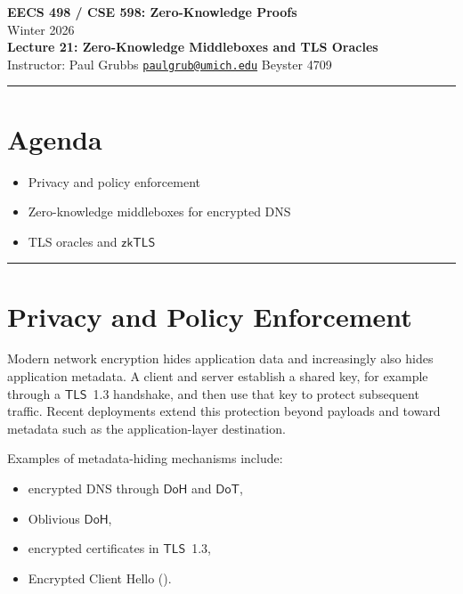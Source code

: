 \documentclass[11pt]{article}
\newcommand{\TLS}{\ensuremath{\mathsf{TLS}}}
\newcommand{\DoH}{\ensuremath{\mathsf{DoH}}}
\newcommand{\DoT}{\ensuremath{\mathsf{DoT}}}
\newcommand{\ZKTLS}{\ensuremath{\mathsf{zkTLS}}}
\begin{document}
\begin{center}
  {\LARGE \textbf{EECS 498 / CSE 598: Zero-Knowledge Proofs}}\\[6pt]
  {\large Winter 2026}\\[4pt]
  {\large \textbf{Lecture 21: Zero-Knowledge Middleboxes and TLS Oracles}}\\[4pt]
  {\large Instructor: Paul Grubbs \quad
    \href{mailto:paulgrub@umich.edu}{\texttt{paulgrub@umich.edu}} \quad
    Beyster 4709}
\end{center}

\vspace{0.5em}
\hrule
\vspace{1em}

\section*{Agenda}
\begin{itemize}
  \item Privacy and policy enforcement
  \item Zero-knowledge middleboxes for encrypted DNS
  \item TLS oracles and \ZKTLS
\end{itemize}

\hrule
\vspace{1em}

\section{Privacy and Policy Enforcement}

Modern network encryption hides application data and increasingly also hides
application metadata.  A client and server establish a shared key, for example
through a \TLS~1.3 handshake, and then use that key to protect subsequent
traffic.  Recent deployments extend this protection beyond payloads and toward
metadata such as the application-layer destination.

Examples of metadata-hiding mechanisms include:
\begin{itemize}
  \item encrypted DNS through \DoH{} and \DoT,
  \item Oblivious \DoH,
  \item encrypted certificates in \TLS~1.3,
  \item Encrypted Client Hello ().
\end{itemize}
\end{document}
